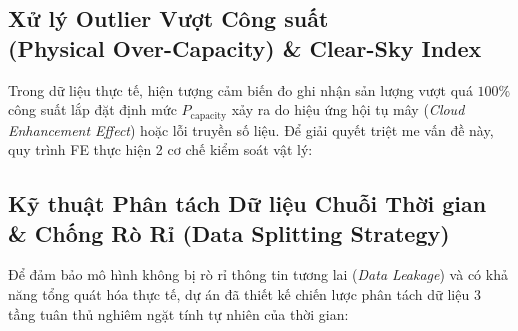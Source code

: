\documentclass[12pt,a4paper]{article}
\begin{document}
\subsection[Xử lý Outlier Vượt Công suất \& Clear-Sky]{Xử lý Outlier Vượt Công suất\\(Physical Over-Capacity) \& Clear-Sky Index}
Trong dữ liệu thực tế, hiện tượng cảm biến đo ghi nhận sản lượng vượt quá $100\%$ công suất lắp đặt định mức $P_{\text{capacity}}$ xảy ra do hiệu ứng hội tụ mây (\textit{Cloud Enhancement Effect}) hoặc lỗi truyền số liệu. Để giải quyết triệt me vấn đề này, quy trình FE thực hiện 2 cơ chế kiểm soát vật lý:

\begin{center}
\end{center}

\subsection[Kỹ thuật Phân tách Dữ liệu]{Kỹ thuật Phân tách Dữ liệu Chuỗi Thời gian \& Chống Rò Rỉ (Data Splitting Strategy)}
Để đảm bảo mô hình không bị rò rỉ thông tin tương lai (\textit{Data Leakage}) và có khả năng tổng quát hóa thực tế, dự án đã thiết kế chiến lược phân tách dữ liệu 3 tầng tuân thủ nghiêm ngặt tính tự nhiên của thời gian:
\end{document}
